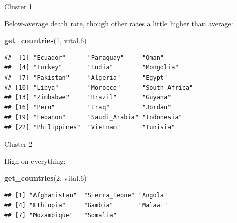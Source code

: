 \documentclass[ignorenonframetext,]{beamer}
\newenvironment{Shaded}{\begin{snugshade}}{\end{snugshade}}
\newcommand{\DecValTok}[1]{\textcolor[rgb]{0.00,0.00,0.81}{#1}}
\newcommand{\FloatTok}[1]{\textcolor[rgb]{0.00,0.00,0.81}{#1}}
\newcommand{\KeywordTok}[1]{\textcolor[rgb]{0.13,0.29,0.53}{\textbf{#1}}}
\newcommand{\NormalTok}[1]{#1}
\begin{document}
\begin{frame}[fragile]{Cluster 1}
\protect\hypertarget{cluster-1-1}{}

Below-average death rate, though other rates a little higher than
average:

\begin{Shaded}
\begin{Highlighting}[]
\KeywordTok{get_countries}\NormalTok{(}\DecValTok{1}\NormalTok{, vital}\FloatTok{.6}\NormalTok{)}
\end{Highlighting}
\end{Shaded}

\begin{verbatim}
##  [1] "Ecuador"      "Paraguay"     "Oman"        
##  [4] "Turkey"       "India"        "Mongolia"    
##  [7] "Pakistan"     "Algeria"      "Egypt"       
## [10] "Libya"        "Morocco"      "South_Africa"
## [13] "Zimbabwe"     "Brazil"       "Guyana"      
## [16] "Peru"         "Iraq"         "Jordan"      
## [19] "Lebanon"      "Saudi_Arabia" "Indonesia"   
## [22] "Philippines"  "Vietnam"      "Tunisia"
\end{verbatim}

\end{frame}

\begin{frame}[fragile]{Cluster 2}
\protect\hypertarget{cluster-2}{}

High on everything:

\begin{Shaded}
\begin{Highlighting}[]
\KeywordTok{get_countries}\NormalTok{(}\DecValTok{2}\NormalTok{, vital}\FloatTok{.6}\NormalTok{)}
\end{Highlighting}
\end{Shaded}

\begin{verbatim}
## [1] "Afghanistan"  "Sierra_Leone" "Angola"      
## [4] "Ethiopia"     "Gambia"       "Malawi"      
## [7] "Mozambique"   "Somalia"
\end{verbatim}

\end{frame}
\end{document}
